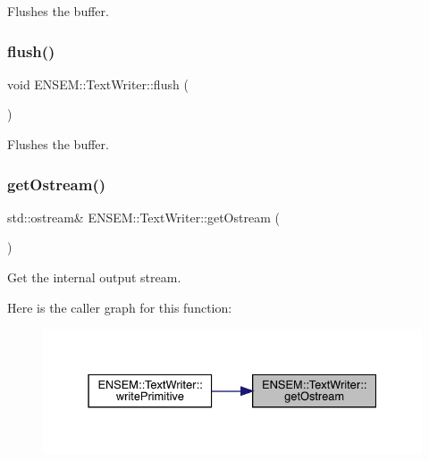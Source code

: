 Flushes the buffer. 

\mbox{\label{classENSEM_1_1TextWriter_a6062726c44aa7c500a065a416ae03a67}} 
\subsubsection{\texorpdfstring{flush()}{flush()}\hspace{0.1cm}{\footnotesize\ttfamily [3/3]}}
{\footnotesize\ttfamily void E\+N\+S\+E\+M\+::\+Text\+Writer\+::flush (\begin{DoxyParamCaption}{ }\end{DoxyParamCaption})}



Flushes the buffer. 

\mbox{\label{classENSEM_1_1TextWriter_a40ade2e6c44ba267efdce5fb70909362}} 
\subsubsection{\texorpdfstring{getOstream()}{getOstream()}\hspace{0.1cm}{\footnotesize\ttfamily [1/3]}}
{\footnotesize\ttfamily std\+::ostream\& E\+N\+S\+E\+M\+::\+Text\+Writer\+::get\+Ostream (\begin{DoxyParamCaption}{ }\end{DoxyParamCaption})\hspace{0.3cm}{\ttfamily [inline]}}



Get the internal output stream. 

Here is the caller graph for this function\+:
\nopagebreak
\begin{figure}[H]
\begin{center}
\leavevmode
\includegraphics[width=331pt]{db/d53/classENSEM_1_1TextWriter_a40ade2e6c44ba267efdce5fb70909362_icgraph}
\end{center}
\end{figure}
\mbox{\label{classENSEM_1_1TextWriter_a40ade2e6c44ba267efdce5fb70909362}} 
